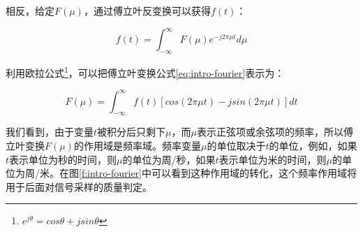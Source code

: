\documentclass[10pt,fancyhdr,graybox, envcountchap,oribibl,twoside]{svmono}
\begin{document}
相反，给定$F(\mu)$，通过傅立叶反变换可以获得$f(t)$：

\begin{equation}
	f(t)=\int^{\infty}_{-\infty}F(\mu)e^{-j2\pi\mu t}d\mu
\end{equation}

利用欧拉公式\footnote{$e^{j\theta}=cos\theta +jsin\theta$}，可以把傅立叶变换公式\ref{eq:intro-fourier}表示为：

\begin{equation}
	F(\mu)=\int^{\infty}_{-\infty}f(t)[cos(2\pi\mu t)-jsin(2\pi\mu t)]dt
\end{equation}

我们看到，由于变量$t$被积分后只剩下$\mu$，而$\mu$表示正弦项或余弦项的频率，所以傅立叶变换$F(\mu)$的作用域是频率域。频率变量$\mu$的单位取决于$t$的单位，例如，如果$t$表示单位为秒的时间，则$\mu$的单位为周/秒，如果$t$表示单位为米的时间，则$\mu$的单位为周/米。在图\ref{f:intro-fourier}中可以看到这种作用域的转化，这个频率作用域将用于后面对信号采样的质量判定。
\end{document}
